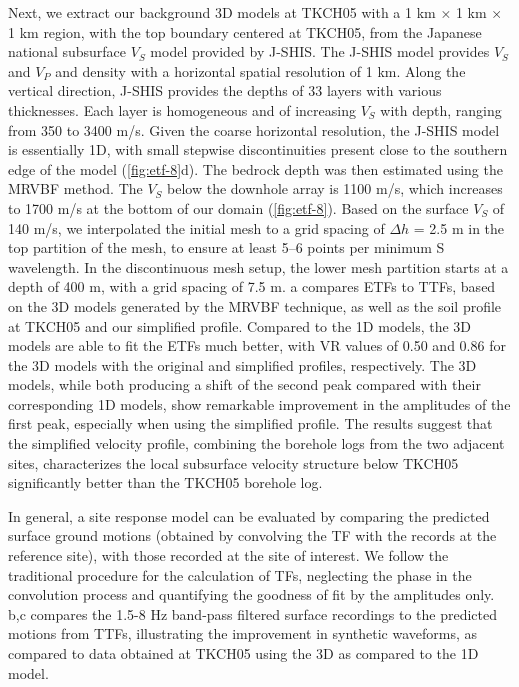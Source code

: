 {Next, we extract our background 3D models at TKCH05 with a 1 km × 1 km × 1 km region, with the top boundary centered at TKCH05, from the Japanese national subsurface $V_S$ model provided by J-SHIS. The J-SHIS model provides $V_S$ and $V_P$ and density with a horizontal spatial resolution of 1 km. Along the vertical direction, J-SHIS provides the depths of 33 layers with various thicknesses. Each layer is homogeneous and of increasing $V_S$ with depth, ranging from 350 to 3400 m/s. Given the coarse horizontal resolution, the J-SHIS model is essentially 1D, with small stepwise discontinuities present close to the southern edge of the model (\cref{fig:etf-8}d). The bedrock depth was then estimated using the MRVBF method. The $V_S$ below the downhole array is 1100 m/s, which increases to 1700 m/s at the bottom of our domain (\cref{fig:etf-8}). Based on the surface $V_S$ of 140 m/s, we interpolated the initial mesh to a grid spacing of $\Delta{h}$ = 2.5 m in the top partition of the mesh, to ensure at least 5–6 points per minimum S wavelength. In the discontinuous mesh setup, the lower mesh partition starts at a depth of 400 m, with a grid spacing of 7.5 m. a compares ETFs to TTFs, based on the 3D models generated by the MRVBF technique, as well as the soil profile at TKCH05 and our simplified profile. Compared to the 1D models, the 3D models are able to fit the ETFs much better, with VR values of 0.50 and 0.86 for the 3D models with the original and simplified profiles, respectively. The 3D models, while both producing a shift of the second peak compared with their corresponding 1D models, show remarkable improvement in the amplitudes of the first peak, especially when using the simplified profile. The results suggest that the simplified velocity profile, combining the borehole logs from the two adjacent sites, characterizes the local subsurface velocity structure below TKCH05 significantly better than the TKCH05 borehole log.

In general, a site response model can be evaluated by comparing the predicted surface ground motions (obtained by convolving the TF with the records at the reference site), with those recorded at the site of interest. We follow the traditional procedure for the calculation of TFs, neglecting the phase in the convolution process and quantifying the goodness of fit by the amplitudes only. b,c compares the 1.5-8 Hz band-pass filtered surface recordings to the predicted motions from TTFs, illustrating the improvement in synthetic waveforms, as compared to data obtained at TKCH05 using the 3D as compared to the 1D model.

}
